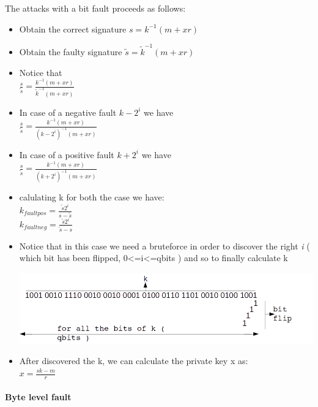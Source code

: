 \documentclass[11pt,english]{article}
\begin{document}
The attacks with a bit fault proceeds as follows: 
\begin{itemize}
\item Obtain the correct signature $s = k^{-1}(m + xr) $
\item Obtain the faulty signature $\tilde{s} = \tilde{k}^{-1}(m + xr)$
\item Notice that \\$\frac{s}{\tilde{s}}  = \frac{k^{-1}(m+xr)}{\tilde{k}^{-1}(m+xr)}$

\item In case of a negative fault $k-2^{i} $ we have\\ $\frac{s}{\tilde{s}} = \frac{k^{-1}(m+xr)}{(k-2^{i})^{-1}(m+xr)}$

\item In case of a positive fault $k+2^{i} $ we have \\$\frac{s}{\tilde{s}} = \frac{k^{-1}(m+xr)}{(k+2^{i})^{-1}(m+xr)}$


\item calulating k for both the case we have: \\$k_{faultpos} = \frac{\tilde{s}2^{i}}{s-\tilde{s}}$ \\
$k_{faultneg} = \frac{\tilde{s}2^{i}}{\tilde{s}-s}$ \\

\item Notice that in this case we need a bruteforce in order to discover the right \textit{i} ( which bit has been flipped, 0<=i<=qbits ) and so to finally calculate k

\includegraphics[width=1.0\textwidth]{img/img_5.png} \\

\item After discovered the k, we can calculate the private key x as:\\ $x = \frac{sk - m}{r}$

\end{itemize}

\paragraph{Byte level fault}
\end{document}
